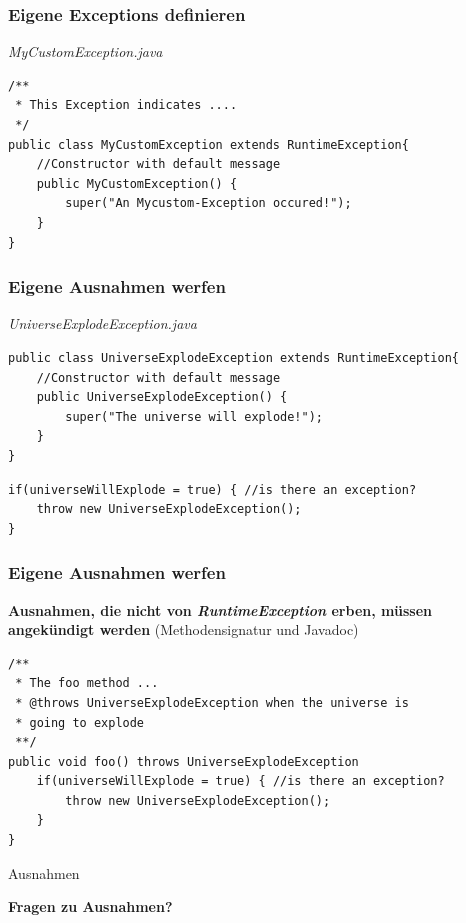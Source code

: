 \documentclass[18pt]{beamer}
\begin{document}
\begin{frame}[containsverbatim]
	\frametitle{Eigene Exceptions definieren}
	\emph{MyCustomException.java}
	\begin{lstlisting}
/**
 * This Exception indicates ....
 */
public class MyCustomException extends RuntimeException{
	//Constructor with default message
	public MyCustomException() {
		super("An Mycustom-Exception occured!");
	}
}
	\end{lstlisting}
\end{frame}


\begin{frame}[containsverbatim]
	\frametitle{Eigene Ausnahmen werfen}

	\emph{UniverseExplodeException.java} 
	\begin{lstlisting}
public class UniverseExplodeException extends RuntimeException{
	//Constructor with default message
	public UniverseExplodeException() {
		super("The universe will explode!");
	}
}
	\end{lstlisting}
	
	\begin{lstlisting}
if(universeWillExplode = true) { //is there an exception?
	throw new UniverseExplodeException();
}
	\end{lstlisting}
\end{frame}


\begin{frame}[containsverbatim]
	\frametitle{Eigene Ausnahmen werfen}

	\textbf{Ausnahmen, die nicht von \emph{RuntimeException} erben, müssen angekündigt werden} (Methodensignatur und Javadoc)
	\begin{lstlisting}
/**
 * The foo method ...
 * @throws UniverseExplodeException when the universe is 
 * going to explode
 **/
public void foo() throws UniverseExplodeException
	if(universeWillExplode = true) { //is there an exception?
		throw new UniverseExplodeException();
	}
}
	\end{lstlisting}
\end{frame}


\begin{frame}{Ausnahmen}
	\begin{center}
		\textbf{Fragen zu Ausnahmen?}
	\end{center}
\end{frame}
\end{document}
